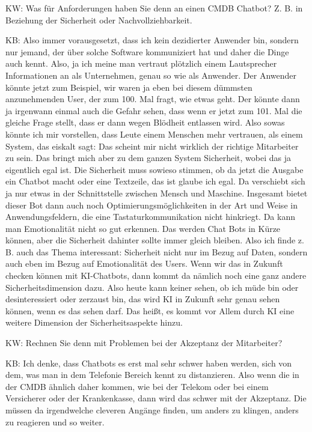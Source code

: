\begin{list}{X:}{\setlength{\labelsep}{5mm}}
\item[KW:] Was für Anforderungen haben Sie denn an einen CMDB Chatbot? Z. B. in Beziehung der Sicherheit oder Nachvollziehbarkeit.
\item[KB:] Also immer vorausgesetzt, dass ich kein dezidierter Anwender bin, sondern nur jemand, der über solche Software kommuniziert hat und daher die Dinge auch kennt. Also, ja ich meine man vertraut plötzlich einem Lautsprecher Informationen an als Unternehmen, genau so wie als Anwender. Der Anwender könnte jetzt zum Beispiel, wir waren ja eben bei diesem dümmsten anzunehmenden User, der zum 100. Mal fragt, wie etwas geht. Der könnte dann ja irgenwann einmal auch die Gefahr sehen, dass wenn er jetzt zum 101. Mal die gleiche Frage stellt, dass er dann wegen Blödheit entlassen wird. Also sowas könnte ich mir vorstellen, dass Leute einem Menschen mehr vertrauen, als einem System, das eiskalt sagt: Das scheint mir nicht wirklich der richtige Mitarbeiter zu sein. Das bringt mich aber zu dem ganzen System Sicherheit, wobei das ja eigentlich egal ist. Die Sicherheit muss sowieso stimmen, ob da jetzt die Ausgabe ein Chatbot macht oder eine Textzeile, das ist glaube ich egal. Da verschiebt sich ja nur etwas in der Schnittstelle zwischen Mensch und Maschine. Insgesamt bietet dieser Bot dann auch noch Optimierungsmöglichkeiten in der Art und Weise in Anwendungsfeldern, die eine Tastaturkommunikation nicht hinkriegt. Da kann man Emotionalität nicht so gut erkennen. Das werden Chat Bots in Kürze können, aber die Sicherheit dahinter sollte immer gleich bleiben. Also ich finde z. B. auch das Thema interessant: Sicherheit nicht nur im Bezug auf Daten, sondern auch eben im Bezug auf Emotionalität des Users. Wenn wir das in Zukunft checken können mit KI-Chatbots, dann kommt da nämlich noch eine ganz andere Sicherheitsdimension dazu. Also heute kann keiner sehen, ob ich müde bin oder desinteressiert oder zerzaust bin, das wird KI in Zukunft sehr genau sehen können, wenn es das sehen darf. Das heißt, es kommt vor Allem durch KI eine weitere Dimension der Sicherheitsaspekte hinzu.
\item[KW:] Rechnen Sie denn mit Problemen bei der Akzeptanz der Mitarbeiter?
\item[KB:] Ich denke, dass Chatbots es erst mal sehr schwer haben werden, sich von dem, was man in dem Telefonie Bereich kennt zu distanzieren. Also wenn die in der CMDB ähnlich daher kommen, wie bei der Telekom oder bei einem Versicherer oder der Krankenkasse, dann wird das schwer mit der Akzeptanz. Die müssen da irgendwelche cleveren Angänge finden, um anders zu klingen, anders zu reagieren und so weiter. 

\end{list}
